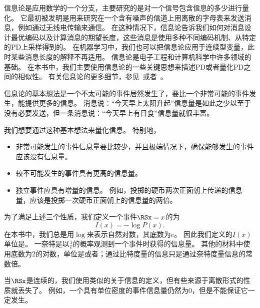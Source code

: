 信息论是应用数学的一个分支，主要研究的是对一个信号包含信息的多少进行量化。
它最初被发明是用来研究在一个含有噪声的信道上用离散的字母表来发送消息，例如通过无线电传输来通信。
在这种情况下，信息论告诉我们如何对消息设计最优编码以及计算消息的期望长度，这些消息是使用多种不同编码机制、从特定的\gls{PD}上采样得到的。
在机器学习中，我们也可以把信息论应用于连续型变量，此时某些消息长度的解释不再适用。
信息论是电子工程和计算机科学中许多领域的基础。
在本书中，我们主要使用信息论的一些关键思想来描述\gls{PD}或者量化\gls{PD}之间的相似性。
有关信息论的更多细节，参见~\cite{cover-book2006}或者~\cite{MacKay03}。

信息论的基本想法是一个不太可能的事件居然发生了，要比一个非常可能的事件发生，能提供更多的信息。
消息说：``今天早上太阳升起''信息量是如此之少以至于没有必要发送，但一条消息说：``今天早上有日食''信息量就很丰富。


我们想要通过这种基本想法来量化信息。
特别地，
\begin{itemize}
\item 非常可能发生的事件信息量要比较少，并且极端情况下，确保能够发生的事件应该没有信息量。

\item 较不可能发生的事件具有更高的信息量。

\item 独立事件应具有增量的信息。
例如，投掷的硬币两次正面朝上传递的信息量，应该是投掷一次硬币正面朝上的信息量的两倍。
\end{itemize}

为了满足上述三个性质，我们定义一个事件$\RSx = x$的为
\begin{equation}
I(x) = -\log P(x).
\end{equation}
在本书中，我们总是用$\log$来表示自然对数，其底数为$e$。
因此我们定义的$I(x)$单位是。
一奈特是以$\frac{1}{e}$的概率观测到一个事件时获得的信息量。
其他的材料中使用底数为2的对数，单位是或者；通过比特度量的信息只是通过奈特度量信息的常数倍。

当$\RSx$是连续的，我们使用类似的关于信息的定义，但有些来源于离散形式的性质就丢失了。
例如，一个具有单位密度的事件信息量仍然为0，但是不能保证它一定发生。

